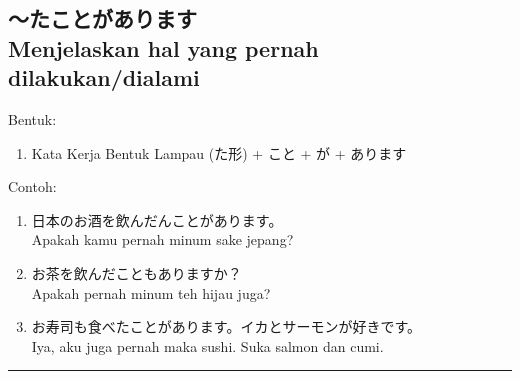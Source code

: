 \subsection*{
    ～たことがあります \\
    Menjelaskan hal yang pernah dilakukan/dialami
}
Bentuk:
\begin{enumerate}
    \item Kata Kerja Bentuk Lampau (た形) + こと + が + あります
\end{enumerate}
Contoh: 
\begin{enumerate}
    \item 日本のお酒を飲んだんことがあります。
    \\ Apakah kamu pernah minum sake jepang?
    \item お茶を飲んだこともありますか？
    \\ Apakah pernah minum teh hijau juga?
    \item お寿司も食べたことがあります。イカとサーモンが好きです。
    \\ Iya, aku juga pernah maka sushi. Suka salmon dan cumi.
\end{enumerate}

\vspace{0.2cm}\hrule height 1pt\vspace{0.2cm}
